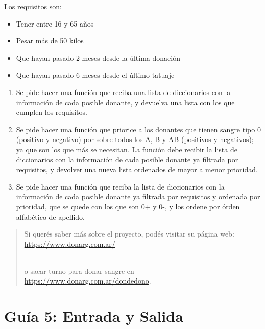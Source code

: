 \documentclass[
  letterpaper,
  DIV=11,
  numbers=noendperiod]{scrreprt}
\providecommand{\tightlist}{%
  \setlength{\itemsep}{0pt}\setlength{\parskip}{0pt}}\usepackage{longtable,booktabs,array}
\begin{document}
\begin{enumerate}
  Los requisitos son:

  \begin{itemize}
  \tightlist
  \item
    Tener entre 16 y 65 años
  \item
    Pesar más de 50 kilos
  \item
    Que hayan pasado 2 meses desde la última donación
  \item
    Que hayan pasado 6 meses desde el último tatuaje
  \end{itemize}

  \begin{enumerate}
  \def\labelenumii{\alph{enumii}.}
  \item
    Se pide hacer una función que reciba una lista de diccionarios con
    la información de cada posible donante, y devuelva una lista con los
    que cumplen los requisitos.
  \item
    Se pide hacer una función que priorice a los donantes que tienen
    sangre tipo 0 (positivo y negativo) por sobre todos los A, B y AB
    (positivos y negativos); ya que son los que más se necesitan. La
    función debe recibir la lista de diccionarios con la información de
    cada posible donante ya filtrada por requisitos, y devolver una
    nueva lista ordenados de mayor a menor prioridad.
  \item
    Se pide hacer una función que reciba la lista de diccionarios con la
    información de cada posible donante ya filtrada por requisitos y
    ordenada por prioridad, que se quede con los que son 0+ y 0-, y los
    ordene por órden alfabético de apellido.
  \end{enumerate}

  \begin{quote}
  Si querés saber más sobre el proyecto, podés visitar su página web:\\
  \url{https://www.donarg.com.ar/}\strut \\
  o sacar turno para donar sangre en\\
  \url{https://www.donarg.com.ar/dondedono}.
  \end{quote}
\end{enumerate}

\section*{Guía 5: Entrada y Salida}\label{guuxeda-5-entrada-y-salida}
\end{document}

